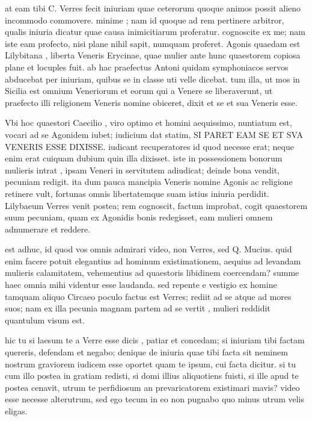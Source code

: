 at eam tibi C. Verres fecit iniuriam quae ceterorum quoque animos possit alieno incommodo commovere. minime ; nam id quoque ad rem pertinere arbitror, qualis iniuria dicatur quae causa inimicitiarum proferatur. cognoscite ex me; nam iste eam profecto, nisi plane nihil sapit, numquam proferet. Agonis quaedam est Lilybitana , liberta Veneris Erycinae, quae mulier ante hunc quaestorem copiosa plane et locuples fuit. ab hac praefectus Antoni quidam symphoniacos servos abducebat per iniuriam, quibus se in classe uti velle dicebat. tum illa, ut mos in Sicilia est omnium Veneriorum et eorum qui a Venere se liberaverunt, ut praefecto illi religionem Veneris nomine obiceret, dixit et se et sua Veneris esse.

 Vbi hoc quaestori Caecilio , viro optimo et homini aequissimo, nuntiatum est, vocari ad se Agonidem iubet; iudicium dat statim, SI PARET EAM SE ET SVA VENERIS ESSE DIXISSE. iudicant recuperatores id quod necesse erat; neque enim erat cuiquam dubium quin illa dixisset. iste in possessionem bonorum mulieris intrat , ipsam Veneri in servitutem adiudicat; deinde bona vendit, pecuniam redigit. ita dum pauca mancipia Veneris nomine Agonis ac religione retinere vult, fortunas omnis libertatemque suam istius iniuria perdidit. Lilybaeum Verres venit postea; rem cognoscit, factum improbat, cogit quaestorem suum pecuniam, quam ex Agonidis bonis redegisset, eam mulieri omnem adnumerare et reddere.

 est adhuc, id quod vos omnis admirari video, non Verres, sed Q. Mucius. quid enim facere potuit elegantius ad hominum existimationem, aequius ad levandam mulieris calamitatem, vehementius ad quaestoris libidinem coercendam? summe haec omnia mihi videntur esse laudanda. sed repente e vestigio ex homine tamquam aliquo Circaeo poculo factus est Verres; rediit ad se atque ad mores suos; nam ex illa pecunia magnam partem ad se vertit , mulieri reddidit quantulum visum est.

 hic tu si laesum te a Verre esse dicis , patiar et concedam; si iniuriam tibi factam quereris, defendam et negabo; denique de iniuria quae tibi facta sit neminem nostrum graviorem iudicem esse oportet quam te ipsum, cui facta dicitur. si tu cum illo postea in gratiam redisti, si domi illius aliquotiens fuisti, si ille apud te postea cenavit, utrum te perfidiosum an prevaricatorem existimari mavis? video esse necesse alterutrum, sed ego tecum in eo non pugnabo quo minus utrum velis eligas.

